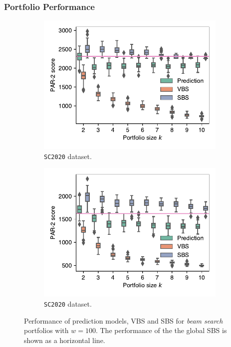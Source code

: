 \documentclass[runningheads]{llncs}
\begin{document}
\subsubsection{Portfolio Performance}

\begin{figure}[htb]
	\centering
	\begin{subfigure}{0.49\columnwidth}
		\centering
		\includegraphics[width=\columnwidth, trim=0 15 0 10, clip]{plots/prediction-test-objective-beam-2020.pdf}
		\caption{\texttt{SC2020} dataset.}
	\end{subfigure}
	\hfil
	\begin{subfigure}{0.49\columnwidth}
		\centering
		\includegraphics[width=\columnwidth, trim=0 15 0 10, clip]{plots/prediction-test-objective-beam-2021.pdf}
		\caption{\texttt{SC2020} dataset.}
	\end{subfigure}
	\hfil
	\caption{
		Performance of prediction models, VBS and SBS for \emph{beam search} portfolios with $w=100$. 
		The performance of the the global SBS is shown as a horizontal line.
	}
	\label{fig:prediction-test-objective-beam}
\end{figure}
\end{document}
